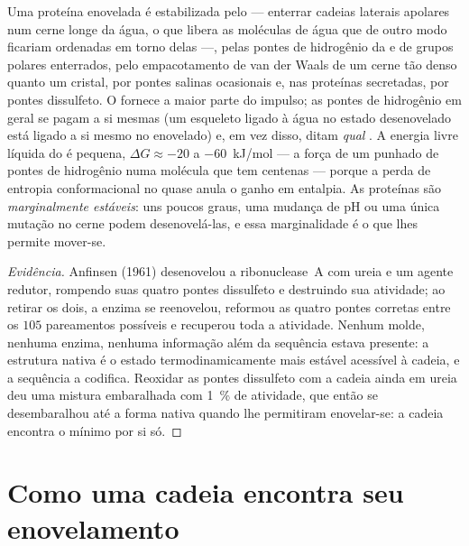 \begin{proposition}\label{prop:b3:structural-biology:forces}
Uma proteína enovelada é estabilizada pelo \emph{}
--- enterrar cadeias laterais apolares num cerne longe da água, o que
libera as moléculas de água que de outro modo ficariam ordenadas em
torno delas ---, pelas pontes de hidrogênio da  e
de grupos polares enterrados, pelo empacotamento de van der Waals de um
cerne tão denso quanto um cristal, por pontes salinas ocasionais e, nas
proteínas secretadas, por pontes dissulfeto. O 
fornece a maior parte do impulso; as pontes de hidrogênio em geral se
pagam a si mesmas (um esqueleto ligado à água no estado desenovelado
está ligado a si mesmo no enovelado) e, em vez disso, ditam
\emph{qual} . A energia livre líquida do  é
pequena, $\Delta G \approx -20$ a \qty{-60}{kJ/mol} --- a força de um
punhado de pontes de hidrogênio numa molécula que tem centenas ---
porque a perda de entropia conformacional no  quase anula o
ganho em entalpia. As proteínas são \emph{marginalmente estáveis}: uns
poucos graus, uma mudança de pH ou uma única mutação no cerne podem
desenovelá-las, e essa marginalidade é o que lhes permite mover-se.
\end{proposition}

\begin{proof}[Evidência]
Anfinsen (1961) desenovelou a ribonuclease~A com ureia e um agente
redutor, rompendo suas quatro pontes dissulfeto e destruindo sua
atividade; ao retirar os dois, a enzima se reenovelou, reformou as
quatro pontes corretas entre os $105$ pareamentos possíveis e
recuperou toda a atividade. Nenhum molde, nenhuma enzima, nenhuma
informação além da sequência estava presente: a estrutura nativa é o
estado termodinamicamente mais estável acessível à cadeia, e a
sequência a codifica. Reoxidar as pontes dissulfeto com a cadeia ainda
em ureia deu uma mistura embaralhada com \qty{1}{\%} de atividade, que
então se desembaralhou até a forma nativa quando lhe permitiram
enovelar-se: a cadeia encontra o mínimo por si só.
\end{proof}

\section{Como uma cadeia encontra seu enovelamento}

